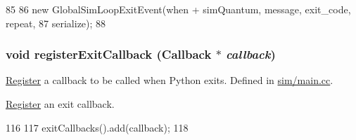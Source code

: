 \begin{DoxyCode}
85 {
86     new GlobalSimLoopExitEvent(when + simQuantum, message, exit_code, repeat,
87                                serialize);
88 }
\end{DoxyCode}
\hypertarget{sim__exit_8hh_a3f0ee1af678f20e62971ddc7deed94af}{
\subsubsection[{registerExitCallback}]{\setlength{\rightskip}{0pt plus 5cm}void registerExitCallback ({\bf Callback} $\ast$ {\em callback})}}
\label{sim__exit_8hh_a3f0ee1af678f20e62971ddc7deed94af}
\hyperlink{classRegister}{Register} a callback to be called when Python exits. Defined in \hyperlink{main_8cc}{sim/main.cc}.

\hyperlink{classRegister}{Register} an exit callback. 


\begin{DoxyCode}
116 {
117     exitCallbacks().add(callback);
118 }
\end{DoxyCode}
